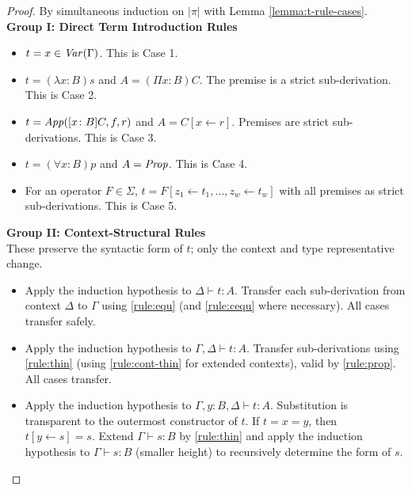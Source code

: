 \inrulecases*
\begin{proof}
    By simultaneous induction on $|\pi|$ with Lemma \ref{lemma:t-rule-cases}. \\[0.2em]
    
    \noindent
    \textbf{Group I: Direct Term Introduction Rules}
    \begin{itemize}
        \item[\ref{rule:ass}] $t = x \in \operatorname{\mathit{Var}}(\Gamma)$. This is Case 1.
        
        \item[\ref{rule:prod-intro}] $t = (\lambda x\colon B)s$ and $A = (\Pi x\colon B)C$. The premise is a strict sub-derivation. This is Case 2.
        
        \item[\ref{rule:prod-elim}] $t = \operatorname{\mathit{App}}([x\colon B]C,f,r)$ and $A = C[x\leftarrow r]$. Premises are strict sub-derivations. This is Case 3.
        
        \item[\ref{rule:forall-intro}] $t = (\forall x\colon B)p$ and $A = \operatorname{\mathit{Prop}}$. This is Case 4.
        
        \item[\textsc{Introductory Rule}] For an operator $F \in \Sigma$,
        $t = F[z_1 \leftarrow t_1, \dots, z_w \leftarrow t_w]$ with all premises as strict sub-derivations. This is Case 5.
    \end{itemize}

    \noindent
    \textbf{Group II: Context-Structural Rules} \\
    These preserve the syntactic form of $t$; only the context and type representative change.
    \begin{itemize}
        \item[\ref{rule:equ}] Apply the induction hypothesis to $\Delta \vdash t \colon A$. Transfer each sub-derivation from context $\Delta$ to $\Gamma$ using \ref{rule:equ} (and \ref{rule:cequ} where necessary). All cases transfer safely.
        
        \item[\ref{rule:thin}] Apply the induction hypothesis to $\Gamma,\Delta \vdash t\colon A$. Transfer sub-derivations using \ref{rule:thin} (using \ref{rule:cont-thin} for extended contexts), valid by \ref{rule:prop}. All cases transfer.
        
        \item[\ref{rule:sub}] Apply the induction hypothesis to $\Gamma,y\colon B,\Delta \vdash t\colon A$. Substitution is transparent to the outermost constructor of $t$. If $t = x = y$, then $t[y\leftarrow s] = s$. Extend $\Gamma \vdash s\colon B$ by \ref{rule:thin} and apply the induction hypothesis to $\Gamma \vdash s\colon B$ (smaller height) to recursively determine the form of $s$.
    \end{itemize}


\end{proof}
